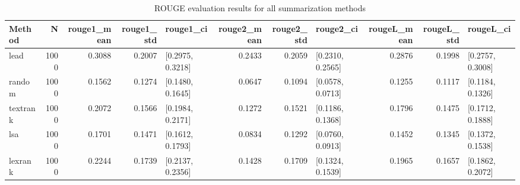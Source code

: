 \begin{table}
\caption{ROUGE evaluation results for all summarization methods}
\label{tab:rouge_results}
\begin{tabular}{lrrrlrrlrrl}
\toprule
Method & N & rouge1_mean & rouge1_std & rouge1_ci & rouge2_mean & rouge2_std & rouge2_ci & rougeL_mean & rougeL_std & rougeL_ci \\
\midrule
lead & 1000 & 0.3088 & 0.2007 & [0.2975, 0.3218] & 0.2433 & 0.2059 & [0.2310, 0.2565] & 0.2876 & 0.1998 & [0.2757, 0.3008] \\
random & 1000 & 0.1562 & 0.1274 & [0.1480, 0.1645] & 0.0647 & 0.1094 & [0.0578, 0.0713] & 0.1255 & 0.1117 & [0.1184, 0.1326] \\
textrank & 1000 & 0.2072 & 0.1566 & [0.1984, 0.2171] & 0.1272 & 0.1521 & [0.1186, 0.1368] & 0.1796 & 0.1475 & [0.1712, 0.1888] \\
lsa & 1000 & 0.1701 & 0.1471 & [0.1612, 0.1793] & 0.0834 & 0.1292 & [0.0760, 0.0913] & 0.1452 & 0.1345 & [0.1372, 0.1538] \\
lexrank & 1000 & 0.2244 & 0.1739 & [0.2137, 0.2356] & 0.1428 & 0.1709 & [0.1324, 0.1539] & 0.1965 & 0.1657 & [0.1862, 0.2072] \\
\bottomrule
\end{tabular}
\end{table}
